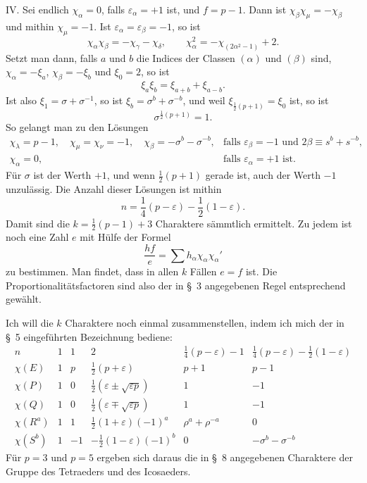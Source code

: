 \documentclass[11pt]{article}
\begin{document}
IV. Sei endlich $\chi_\alpha=0$, falls $\varepsilon_\alpha=+1$ ist, und $f=p-1$. Dann ist $\chi_\beta\chi_\mu=-\chi_\beta$ und mithin $\chi_\mu=-1$. Ist $\varepsilon_\alpha=\varepsilon_\beta=-1$, so ist
\[
\chi_\alpha\chi_\beta=-\chi_\gamma-\chi_\delta,\qquad
\chi_\alpha^2=-\chi_{(2\alpha^2-1)}+2.
\]
Setzt man dann, falls $a$ und $b$ die Indices der Classen $(\alpha)$ und $(\beta)$ sind, $\chi_\alpha=-\xi_a$, $\chi_\beta=-\xi_b$ und $\xi_0=2$, so ist
\[
\xi_a\xi_b=\xi_{a+b}+\xi_{a-b}.
\]
Ist also $\xi_1=\sigma+\sigma^{-1}$, so ist $\xi_b=\sigma^b+\sigma^{-b}$, und weil $\xi_{\frac12(p+1)}=\xi_0$ ist, so ist
\begin{equation*}\tag{11.}
\sigma^{\frac12(p+1)}=1.
\end{equation*}
So gelangt man zu den Lösungen
\[
\begin{array}{ll}
\chi_\lambda=p-1,\quad \chi_\mu=\chi_\nu=-1,\quad
\chi_\beta=-\sigma^b-\sigma^{-b},&
\text{falls }\varepsilon_\beta=-1\text{ und }2\beta\equiv s^b+s^{-b},\\
\chi_\alpha=0,&
\text{falls }\varepsilon_\alpha=+1\text{ ist.}
\end{array}
\]
Für $\sigma$ ist der Werth $+1$, und wenn $\frac12(p+1)$ gerade ist, auch der Werth $-1$ unzulässig. Die Anzahl dieser Lösungen ist mithin
\begin{equation*}\tag{12.}
n=\frac14(p-\varepsilon)-\frac12(1-\varepsilon).
\end{equation*}
Damit sind die $k=\frac12(p-1)+3$ Charaktere sämmtlich ermittelt. Zu jedem ist noch eine Zahl $e$ mit Hülfe der Formel
\[
\frac{hf}{e}=\sum h_\alpha\chi_\alpha\chi_\alpha'
\]
zu bestimmen. Man findet, dass in allen $k$ Fällen $e=f$ ist. Die Proportionalitätsfactoren sind also der in \S~3 angegebenen Regel entsprechend gewählt.

Ich will die $k$ Charaktere noch einmal zusammenstellen, indem ich mich der in \S~5 eingeführten Bezeichnung bediene:
\[
\begin{array}{c|ccccc}
n & 1 & 1 & 2 & \frac14(p-\varepsilon)-1 & \frac14(p-\varepsilon)-\frac12(1-\varepsilon)\\ \hline
\chi(E) & 1 & p & \frac12(p+\varepsilon) & p+1 & p-1\\
\chi(P) & 1 & 0 & \frac12(\varepsilon\pm\sqrt{\varepsilon p}) & 1 & -1\\
\chi(Q) & 1 & 0 & \frac12(\varepsilon\mp\sqrt{\varepsilon p}) & 1 & -1\\
\chi(R^a) & 1 & 1 & \frac12(1+\varepsilon)(-1)^a & \rho^a+\rho^{-a} & 0\\
\chi(S^b) & 1 & -1 & -\frac12(1-\varepsilon)(-1)^b & 0 & -\sigma^b-\sigma^{-b}
\end{array}
\]
Für $p=3$ und $p=5$ ergeben sich daraus die in \S~8 angegebenen Charaktere der Gruppe des Tetraeders und des Icosaeders.
\end{document}
